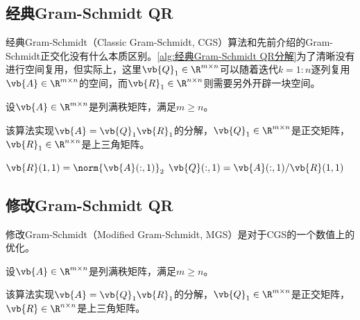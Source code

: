 \subsection{经典Gram-Schmidt QR}

经典Gram-Schmidt（Classic Gram-Schmidt, CGS）算法和先前介绍的Gram-Schmidt正交化没有什么本质区别。\cref{alg:经典Gram-Schmidt QR分解}为了清晰没有进行空间复用，但实际上，这里$\vb{Q}_1\in\R^{m\times n}$可以随着迭代$k=1:n$逐列复用$\vb{A}\in\R^{m\times n}$的空间，而$\vb{R}_1\in\R^{n\times n}$则需要另外开辟一块空间。

\begin{BoxAlgorithm}
    设$\vb{A}\in\R^{m\times n}$是列满秩矩阵，满足$m\geq n$。

    该算法实现$\vb{A}=\vb{Q}_1\vb{R}_1$的分解，$\vb{Q}_1\in\R^{m\times n}$是正交矩阵，$\vb{R}_1\in\R^{n\times n}$是上三角矩阵。
    
    \begin{Algoplain}
        $\vb{R}(1,1)=\norm{\vb{A}(:,1)}_2$\;
        $\vb{Q}(:,1)=\vb{A}(:,1)/\vb{R}(1,1)$\;
    \end{Algoplain}
\end{BoxAlgorithm}


\subsection{修改Gram-Schmidt QR}

修改Gram-Schmidt（Modified Gram-Schmidt, MGS）是对于CGS的一个数值上的优化。

\begin{BoxAlgorithm}
    设$\vb{A}\in\R^{m\times n}$是列满秩矩阵，满足$m\geq n$。

    该算法实现$\vb{A}=\vb{Q}_1\vb{R}_1$的分解，$\vb{Q}_1\in\R^{m\times n}$是正交矩阵，$\vb{R}\in\R^{n\times n}$是上三角矩阵。
    
    \begin{Algoplain}
    \end{Algoplain}
\end{BoxAlgorithm}

